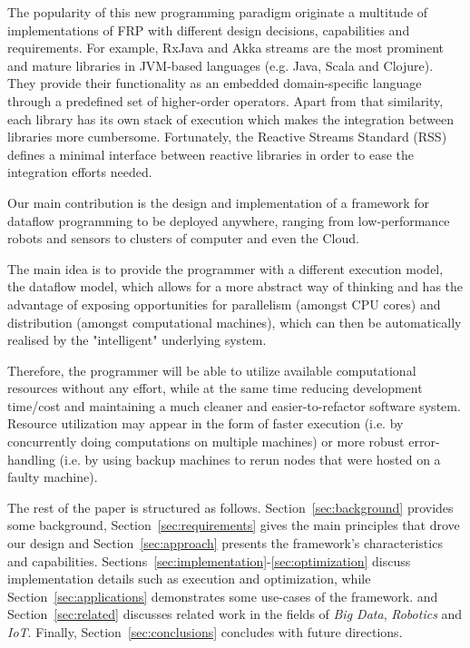 \documentclass[sigplan,review,anonymous,screen]{acmart}
\begin{document}
The popularity of this new programming paradigm originate a multitude of
implementations of FRP with different design decisions, capabilities and requirements.
For example, RxJava and Akka streams are the most prominent and mature
libraries in JVM-based languages (e.g. Java, Scala and Clojure). They provide their
functionality as an embedded domain-specific language through a predefined set of
higher-order operators. Apart from that similarity, each library has its own stack
of execution which makes the integration between libraries more cumbersome.
Fortunately, the Reactive Streams Standard (RSS) defines a minimal interface between
reactive libraries in order to ease the integration efforts needed.

Our main contribution is the design and implementation of a framework for
dataflow programming to be deployed anywhere, ranging from low-performance
robots and sensors to clusters of computer and even the Cloud.

The main idea is to provide the programmer with a different execution model, the
dataflow model, which allows for a more abstract way of thinking and has the
advantage of exposing opportunities for parallelism (amongst CPU cores) and
distribution (amongst computational machines), which can then be automatically
realised by the "intelligent" underlying system.

Therefore, the programmer will be able to utilize available computational
resources without any effort, while at the same time reducing development
time/cost and maintaining a much cleaner and easier-to-refactor software system.
Resource utilization may appear in the form of faster execution (i.e. by
concurrently doing computations on multiple machines) or more robust
error-handling (i.e. by using backup machines to rerun nodes that were hosted
on a faulty machine).

The rest of the paper is structured as follows.
Section~\ref{sec:background} provides some background,
Section~\ref{sec:requirements} gives the main principles that drove our design
and Section~\ref{sec:approach} presents the framework's characteristics and capabilities.
Sections~\ref{sec:implementation}-\ref{sec:optimization} discuss implementation details
such as execution and optimization,
while Section~\ref{sec:applications} demonstrates some use-cases of the framework.
and Section~\ref{sec:related} discusses related work in the fields of
\textit{Big Data}, \textit{Robotics} and \textit{IoT}.
Finally, Section~\ref{sec:conclusions} concludes with future directions.
\end{document}
